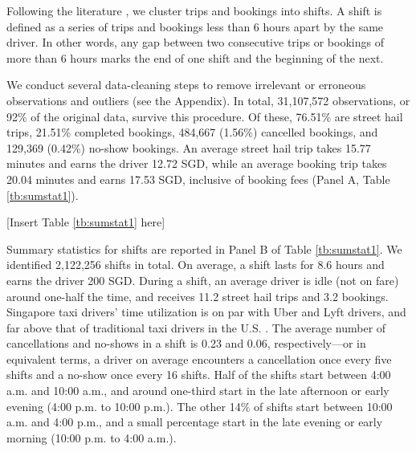 \documentclass[reviewmode]{restud}
\begin{document}
Following the literature \citep{farber2015you,agarwal2015singaporean,martin2017quit,chen2015dynamic}, we cluster trips and bookings into shifts. A shift is defined as a series of trips and bookings less than 6 hours apart by the same driver. In other words, any gap between two consecutive trips or bookings of more than 6 hours marks the end of one shift and the beginning of the next. 

We conduct several data-cleaning steps to remove irrelevant or erroneous observations and outliers (see the Appendix).
In total, 31,107,572 observations, or 92\% of the original data, survive this procedure. Of these, 76.51\% are street hail trips, 21.51\% completed bookings, 484,667 (1.56\%) cancelled bookings, and 129,369 (0.42\%) no-show bookings. An average street hail trip takes 15.77 minutes and earns the driver 12.72 SGD, while an average  booking trip takes 20.04 minutes and earns 17.53 SGD, inclusive of booking fees (Panel A, Table \ref{tb:sumstat1}).


\begin{center}
	[Insert Table \ref{tb:sumstat1} here]
\end{center}


Summary statistics for shifts are reported in Panel B of Table \ref{tb:sumstat1}. We identified 2,122,256 shifts in total. On average, a shift lasts for 8.6 hours and earns the driver 200 SGD. During a shift, an average driver is idle (not on fare) around one-half the time, and receives 11.2 street hail trips and 3.2 bookings.  Singapore taxi drivers' time utilization is on par with Uber and Lyft drivers, and far above that of traditional taxi drivers in the U.S. \citep{cramer2016disruptive}. The average number of cancellations and no-shows in a shift is 0.23 and 0.06, respectively---or in equivalent terms, a driver on average encounters a cancellation once every five shifts and a no-show once every 16 shifts. Half of the shifts start between 4:00 a.m. and 10:00 a.m., and around one-third start in the late afternoon or early evening (4:00 p.m. to 10:00 p.m.). The other 14\% of shifts start between 10:00 a.m. and 4:00 p.m., and a small percentage start in the late evening or early morning (10:00 p.m. to 4:00 a.m.).
\end{document}
